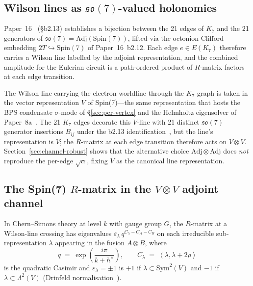 \documentclass[11pt]{article}
\newcommand{\so}{\mathfrak{so}}
\newcommand{\Spin}{\mathrm{Spin}}
\newcommand{\Adj}{\mathrm{Adj}}
\newcommand{\Sym}{\mathrm{Sym}}
\newcommand{\ip}[2]{\left\langle#1,#2\right\rangle}
\newcommand{\hv}{h^{\vee}}
\begin{document}
\subsection{Wilson lines as $\so(7)$-valued holonomies}
\label{sec:k7-wilson-lines}

Paper~16~\cite{paper16} (\S b2.13) establishes a bijection between
the 21 edges
of $K_7$ and the 21 generators of $\so(7) = \mathrm{Adj}(\Spin(7))$,
lifted via the octonion Clifford embedding
$2T \hookrightarrow \Spin(7)$ of Paper~16~b2.12.  Each edge
$e \in E(K_7)$ therefore carries a Wilson line labelled by the
adjoint representation, and the combined amplitude for the
Eulerian circuit is a path-ordered product of $R$-matrix factors
at each edge transition.

The Wilson line carrying the electron worldline through the $K_7$
graph is taken in the vector representation $V$ of Spin(7)---the
same representation that hosts the BPS condensate $\sigma$-mode of
\S\ref{sec:per-vertex} and the Helmholtz eigensolver of
Paper~8a~\cite{paper8a}.  The 21 $K_7$ edges decorate this
$V$-line with 21 distinct $\so(7)$ generator insertions $B_{ij}$
under the b2.13 identification~\cite{paper16}, but the line's
representation is $V$; the $R$-matrix at each edge transition
therefore acts on $V \otimes V$.  Section~\ref{sec:channel-robust}
shows that the alternative choice $\Adj \otimes \Adj$ does
\emph{not} reproduce the per-edge $\sqrt{\alpha}$, fixing $V$ as
the canonical line representation.

\subsection{The Spin(7) $R$-matrix in the $V \otimes V$ adjoint channel}
\label{sec:rt-root-alpha}

In Chern--Simons theory at level $k$ with gauge group $G$, the
$R$-matrix at a Wilson-line crossing has eigenvalues
$\varepsilon_\lambda \, q^{C_\lambda - C_A - C_B}$ on each
irreducible sub-representation $\lambda$ appearing in the fusion
$A \otimes B$, where
\begin{equation}
  q \;=\; \exp\!\left(\frac{i\pi}{k + \hv}\right),
  \qquad
  C_\lambda \;=\; \ip{\lambda}{\lambda + 2\rho}
\end{equation}
is the quadratic Casimir and
$\varepsilon_\lambda = \pm 1$ is $+1$ if $\lambda \subset \Sym^2(V)$
and $-1$ if $\lambda \subset \Lambda^2(V)$ (Drinfeld
normalisation~\cite{reshetikhin-turaev}).
\end{document}

